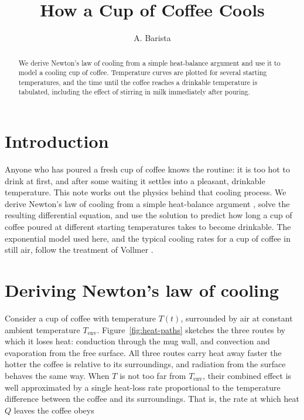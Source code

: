 \documentclass[11pt]{article}
\title{How a Cup of Coffee Cools}
\author{A. Barista}
\date{}
\begin{document}
\maketitle

\begin{abstract}
  We derive Newton's law of cooling from a simple heat-balance argument and
  use it to model a cooling cup of coffee. Temperature curves are plotted
  for several starting temperatures, and the time until the coffee reaches
  a drinkable temperature is tabulated, including the effect of stirring
  in milk immediately after pouring.
\end{abstract}

\section{Introduction}

Anyone who has poured a fresh cup of coffee knows the routine: it is too hot
to drink at first, and after some waiting it settles into a pleasant,
drinkable temperature. This note works out the physics behind that cooling
process. We derive Newton's law of cooling from a simple heat-balance
argument \cite{newton1701}, solve the resulting differential equation, and
use the solution to predict how long a cup of coffee poured at different
starting temperatures takes to become drinkable. The exponential model used
here, and the typical cooling rates for a cup of coffee in still air, follow
the treatment of Vollmer \cite{vollmer2009}.

\section{Deriving Newton's law of cooling}

Consider a cup of coffee with temperature $T(t)$, surrounded by air at
constant ambient temperature $T_{\text{env}}$. Figure~\ref{fig:heat-paths}
sketches the three routes by which it loses heat: conduction through the
mug wall, and convection and evaporation from the free surface. All three
routes carry heat away faster the hotter the coffee is relative to its
surroundings, and radiation from the surface behaves the same way. When $T$
is not too far from $T_{\text{env}}$, their combined effect is well
approximated by a single heat-loss rate proportional to the temperature
difference between the coffee and its surroundings. That is, the rate at
which heat $Q$ leaves the coffee obeys
\end{document}
